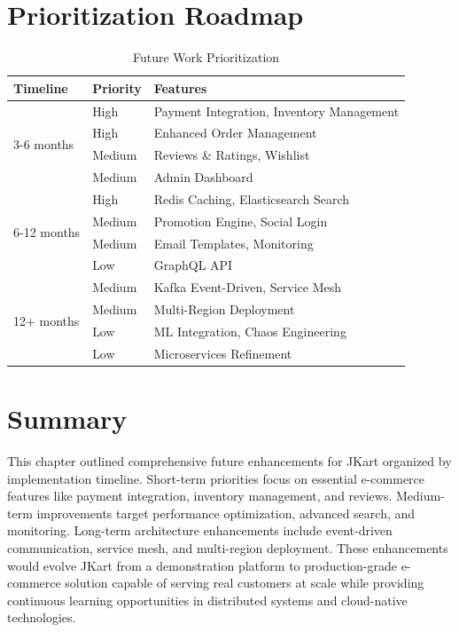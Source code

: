 \section{Prioritization Roadmap}

\begin{table}[h!]
\centering
\caption{Future Work Prioritization}
\begin{tabular}{|l|l|l|}
\hline
\textbf{Timeline} & \textbf{Priority} & \textbf{Features} \\
\hline
\multirow{4}{*}{3-6 months} & High & Payment Integration, Inventory Management \\
& High & Enhanced Order Management \\
& Medium & Reviews \& Ratings, Wishlist \\
& Medium & Admin Dashboard \\
\hline
\multirow{4}{*}{6-12 months} & High & Redis Caching, Elasticsearch Search \\
& Medium & Promotion Engine, Social Login \\
& Medium & Email Templates, Monitoring \\
& Low & GraphQL API \\
\hline
\multirow{4}{*}{12+ months} & Medium & Kafka Event-Driven, Service Mesh \\
& Medium & Multi-Region Deployment \\
& Low & ML Integration, Chaos Engineering \\
& Low & Microservices Refinement \\
\hline
\end{tabular}
\end{table}

\section{Summary}

This chapter outlined comprehensive future enhancements for JKart organized by implementation timeline. Short-term priorities focus on essential e-commerce features like payment integration, inventory management, and reviews. Medium-term improvements target performance optimization, advanced search, and monitoring. Long-term architecture enhancements include event-driven communication, service mesh, and multi-region deployment. These enhancements would evolve JKart from a demonstration platform to production-grade e-commerce solution capable of serving real customers at scale while providing continuous learning opportunities in distributed systems and cloud-native technologies.
